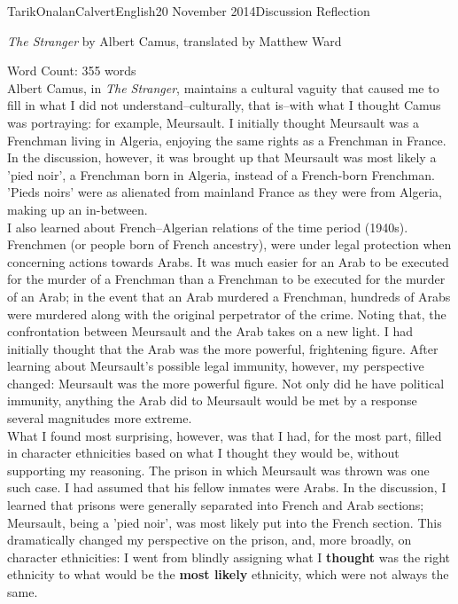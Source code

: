 \documentclass[12pt]{article}
\begin{document}
    \begin{mla}{Tarik}{Onalan}{Calvert}{English}{20 November 2014}{Discussion Reflection}
        \centerline{\textit{The Stranger} by Albert Camus, translated by Matthew Ward}
        \noindent{}Word Count: 355 words \\
        Albert Camus, in \textit{The Stranger}, maintains a cultural vaguity that
        caused me to fill in what I did not understand--culturally, that is--with
        what I thought Camus was portraying: for example, Meursault. I initially
        thought Meursault was a Frenchman living in Algeria, enjoying the same rights
        as a Frenchman in France. In the discussion, however, it was brought up
        that Meursault was most likely a 'pied noir', a Frenchman born in Algeria,
        instead of a French-born Frenchman. 'Pieds noirs' were as alienated from
        mainland France as they were from Algeria, making up an in-between. \\

        I also learned about French--Algerian relations of the time period (1940s).
        Frenchmen (or people born of French ancestry), were under legal protection when
        concerning actions towards Arabs. It was much easier for an Arab to be executed
        for the murder of a Frenchman than a Frenchman to be executed for the murder of an
        Arab; in the event that an Arab murdered a Frenchman, hundreds of Arabs were
        murdered along with the original perpetrator of the crime. Noting that, the
        confrontation between Meursault and the Arab takes on a new light. I had initially
        thought that the Arab was the more powerful, frightening figure. After learning
        about Meursault's possible legal immunity, however, my perspective changed:
        Meursault was the more powerful figure. Not only did he have political immunity,
        anything the Arab did to Meursault would be met by a response several magnitudes
        more extreme. \\

        What I found most surprising, however, was that I had, for the most part,
        filled in character ethnicities based on what I thought they would be, without
        supporting my reasoning. The prison in which Meursault was thrown was one such
        case. I had assumed that his fellow inmates were Arabs. In the discussion,
        I learned that prisons were generally separated into French and Arab sections;
        Meursault, being a 'pied noir', was most likely put into the French section.
        This dramatically changed my perspective on the prison, and, more broadly, on
        character ethnicities: I went from blindly assigning what I \textbf{thought}
        was the right ethnicity to what would be the \textbf{most likely} ethnicity,
        which were not always the same.
    \end{mla}
\end{document}
